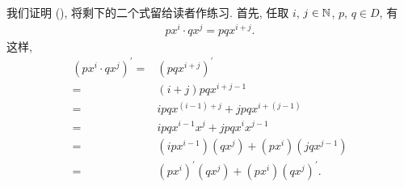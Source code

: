\begin{pf}
    我们证明 (\myStar), 将剩下的二个式留给读者作练习. 首先, 任取 $i$, $j \in \mathbb{N}$, $p$, $q \in D$, 有
    \begin{align*}
        px^i \cdot qx^j = pqx^{i+j}.
    \end{align*}
    这样,
    \begin{align*}
        (px^i \cdot qx^j)^{\prime}
        = {} & (pqx^{i+j})^{\prime}                             \\
        = {} & (i+j)pq x^{i+j-1}                                \\
        = {} & ipq x^{(i-1)+j} + jpq x^{i+(j-1)}                \\
        = {} & ipq x^{i-1} x^j + jpq x^i x^{j-1}                \\
        = {} & (ipx^{i-1}) (qx^j) + (px^i) (jqx^{j-1})          \\
        = {} & (px^i)^{\prime} (qx^j) + (px^i) (qx^j)^{\prime}.
    \end{align*}


\end{pf}
